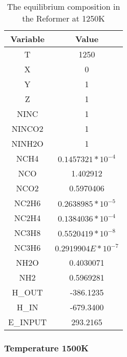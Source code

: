 \documentclass[journal=iecred,manuscript=article]{achemso}
\begin{document}
\FloatBarrier
\begin{table}[H]
\caption{The equilibrium composition in the Reformer at 1250K} 
\centering
\begin{tabular}{|c|c|}
\hline\hline %
Variable & Value \\ 
[1ex] %
\hline %
T	& 1250 \\
\hline
X	 & 0 \\
\hline
Y	& 1 \\
\hline
Z	& 1 \\
\hline
NINC	& 1 \\
\hline
NINCO2	& 1 \\
\hline
NINH2O	& 1 \\
\hline
NCH4 &	$0.1457321*10^{-4}$ \\
\hline
NCO	&  1.402912 \\
\hline
NCO2	& 0.5970406 \\
\hline
NC2H6	& $0.2638985*10^{-5}$ \\
\hline
NC2H4	& $0.1384036*10^{-4}$ \\
\hline
NC3H8	& $0.5520419*10^{-8}$ \\
\hline
NC3H6	& $0.2919904E*10^{-7}$ \\
\hline
NH2O	& 0.4030071 \\
\hline
NH2 & 0.5969281 \\
\hline
H_{OUT}	& -386.1235 \\
\hline
H_{IN}	& -679.3400 \\
\hline
E_{INPUT}	& 293.2165 \\
\hline 

\end{tabular}
\end{table}
\FloatBarrier

\subsubsection{Temperature 1500K}
\end{document}

